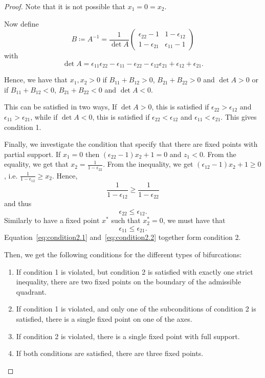\documentclass{article} %
\newcounter{ct}
\theoremstyle{definition}
\theoremstyle{remark}
\begin{document}
\begin{proof}
Note that it is not possible that \(x_{1} = 0=x_{2}\).

Now define
\[
B\coloneqq A^{-1} = \frac{1}{\det A}
\begin{pmatrix}
\epsilon_{22}-1  &  1-\epsilon_{12} \\
1-\epsilon_{21}  &  \epsilon_{11}-1
\end{pmatrix}
\]
with \[\det A = \epsilon_{11}\epsilon_{22}-\epsilon_{11}-\epsilon_{22}-\epsilon_{12}\epsilon_{21}+\epsilon_{12}+\epsilon_{21}.\]

Hence, we have that \(x_{1}, x_{2}>0\) if \(B_{11}+B_{12}>0\), \(B_{21}+B_{22}>0\) and \(\det A >0\)
or if \(B_{11}+B_{12}<0\), \(B_{21}+B_{22}<0\) and \(\det A <0\).

This can be satisfied in two ways,
If \(\det A >0\), this is satisfied if \(\epsilon_{22}>\epsilon_{12}\) and \(\epsilon_{11}>\epsilon_{21}\),
while if \(\det A <0\), this is satisfied if \(\epsilon_{22}<\epsilon_{12}\) and \(\epsilon_{11}<\epsilon_{21}\).
This gives condition 1. %



Finally, we investigate the condition that specify that there are fixed points with partial support.
If \(x_{1} = 0\) then \((\epsilon_{22}-1)x_{2} + 1=0\) and \(z_{1}<0\).
From the equality, we get that \(x_{2}=\frac{1}{1-\epsilon_{22}}\).
From the inequality, we get  \((\epsilon_{12}-1)x_{2} + 1\geq 0\), i.e. \(\frac{1}{1-\epsilon_{12}}\geq x_{2}\).
Hence,
\begin{equation*}
\frac{1}{1-\epsilon_{12}}\geq\frac{1}{1-\epsilon_{22}}
\end{equation*}and thus
\begin{equation}\label{eq:condition2.1}
\epsilon_{22} \leq \epsilon_{12}.
\end{equation}
Similarly to have a fixed point \(x^*\) such that \(x_{2}^*=0\), we must have that
\begin{equation}\label{eq:condition2.2}
\epsilon_{11} \leq \epsilon_{21}.
\end{equation}
Equation~\ref{eq:condition2.1} and~\ref{eq:condition2.2} together form condition 2.


Then, we get the following conditions for the different types of bifurcations:
\begin{enumerate}
\item  If condition 1 is violated, but condition 2 is satisfied with exactly one strict inequality, there are two fixed points on the boundary of the admissible quadrant.
\item If condition 1 is violated, and only one of the subconditions of condition 2 is satisfied, there is a single fixed point on one of the axes.
\item If condition 2 is violated, there is a single fixed point with full support.
\item If both conditions are satisfied, there are three fixed points.
\end{enumerate}



\end{proof}
\end{document}
